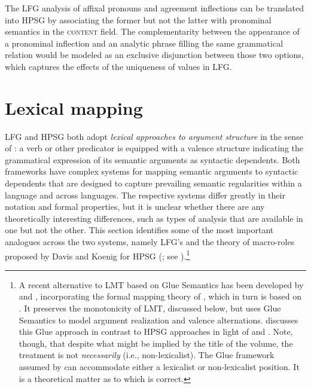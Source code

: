 The LFG analysis of  affixal pronouns and agreement inflections can be translated into HPSG by associating the former but not the latter with pronominal semantics in the \textsc{content} field.  
The complementarity between the appearance of a pronominal inflection and an analytic phrase filling the same grammatical relation would be modeled as an exclusive disjunction between those two options, which captures the effects of the uniqueness of  values in LFG.  
                  
                  
\section{Lexical mapping}

LFG and HPSG both adopt \textit{lexical approaches to argument structure} in the sense of \citet{MWArgSt}: a verb or other predicator is equipped with a valence structure indicating the grammatical expression of its semantic arguments as syntactic dependents.  Both frameworks have complex systems for mapping semantic arguments to syntactic dependents that are designed to capture prevailing semantic regularities within a language and across languages.   The respective systems differ greatly in their notation and formal properties, but it is unclear whether 
there are any theoretically interesting differences, such as types of analysis that are available in one but not the other.  This section identifies some of the most important  analogues across the two systems, namely LFG's  \citep[LMT;][Chapter 14]{BATW2016a} and the theory of macro-roles proposed by Davis and Koenig for HPSG (\citealt{Davis96a-u,DK2000b-u}; see ).\footnote{A recent alternative to LMT based on Glue Semantics has been developed by \citet{asudeh;giorgolo-lfg12} and \citet{asudeh;ea14-lfg}, incorporating the formal mapping theory of \citet{findlay16}, which in turn is based on \citet{kibort07}. It preserves the monotonicity of LMT, discussed below, but uses Glue Semantics to model argument realization and valence alternations. \citet{MuellerLFGphrasal} discusses this Glue approach in contrast to HPSG approaches in light of  and . Note, though, that despite what might be implied by the title of the \citeauthor{MuellerLFGphrasal} volume, the \citeauthor{asudeh;ea14-lfg} treatment is not \emph{necessarily}  (i.e., non-lexicalist). The  Glue framework assumed by \citeauthor{asudeh;ea14-lfg} can accommodate either a lexicalist or non-lexicalist position. It is a theoretical matter as to which is correct.}

